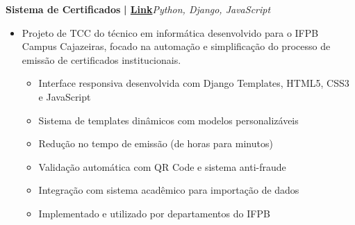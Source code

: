 \documentclass[a4paper]{article}
\begin{document}
{\textbf{Sistema de Certificados}}\textbf{ | \href{https://github.com/bodescorp/Cext-final-}{Link}}\hfill{\sl Python, Django, JavaScript}\\
\vspace{-3mm}
\begin{itemize} \itemsep -3pt
    \item[] Projeto de TCC do técnico em informática desenvolvido para o IFPB Campus Cajazeiras, focado na automação e simplificação do processo de emissão de certificados institucionais.
        \begin{itemize}
            \item Interface responsiva desenvolvida com Django Templates, HTML5, CSS3 e JavaScript
            \item Sistema de templates dinâmicos com modelos personalizáveis
            \item Redução no tempo de emissão (de horas para minutos)
            \item Validação automática com QR Code e sistema anti-fraude
            \item Integração com sistema acadêmico para importação de dados
            \item Implementado e utilizado por departamentos do IFPB
        \end{itemize}
\end{itemize}
\vspace*{2mm}
\end{document}
